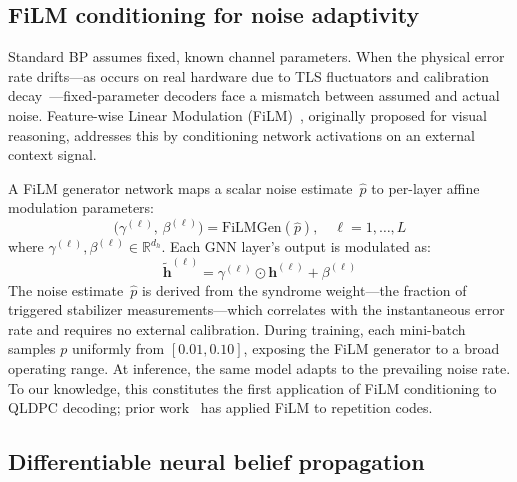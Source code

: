 \documentclass[a4paper,twocolumn,11pt,unpublished,nopdfoutputerror]{quantumarticle}
\newcommand{\R}{\mathbb{R}}
\newcommand{\bvec}[1]{\mathbf{#1}}
\newcommand{\phat}{\hat{p}}
\begin{document}
\subsection{FiLM conditioning for noise adaptivity}\label{sec:film}

Standard BP assumes fixed, known channel parameters. When the physical error rate drifts---as occurs on real hardware due to TLS fluctuators and calibration decay~\cite{Klimov2018,Burnett2019Decoherence}---fixed-parameter decoders face a mismatch between assumed and actual noise. Feature-wise Linear Modulation (FiLM)~\cite{Perez2018FiLM}, originally proposed for visual reasoning, addresses this by conditioning network activations on an external context signal.

A FiLM generator network maps a scalar noise estimate~$\phat$ to per-layer affine modulation parameters:
\begin{equation}
\bigl(\gamma^{(\ell)},\, \beta^{(\ell)}\bigr) = \mathrm{FiLMGen}(\phat), \quad \ell = 1,\ldots,L
\label{eq:filmgen}
\end{equation}
where $\gamma^{(\ell)}, \beta^{(\ell)} \in \R^{d_h}$. Each GNN layer's output is modulated as:
\begin{equation}
\tilde{\bvec{h}}^{(\ell)} = \gamma^{(\ell)} \odot \bvec{h}^{(\ell)} + \beta^{(\ell)}
\label{eq:film}
\end{equation}
The noise estimate~$\phat$ is derived from the syndrome weight---the fraction of triggered stabilizer measurements---which correlates with the instantaneous error rate and requires no external calibration. During training, each mini-batch samples $p$ uniformly from $[0.01, 0.10]$, exposing the FiLM generator to a broad operating range. At inference, the same model adapts to the prevailing noise rate. To our knowledge, this constitutes the first application of FiLM conditioning to QLDPC decoding; prior work~\cite{Stein2026FiLM} has applied FiLM to repetition codes.

\subsection{Differentiable neural belief propagation}\label{sec:neuralbp}
\end{document}
